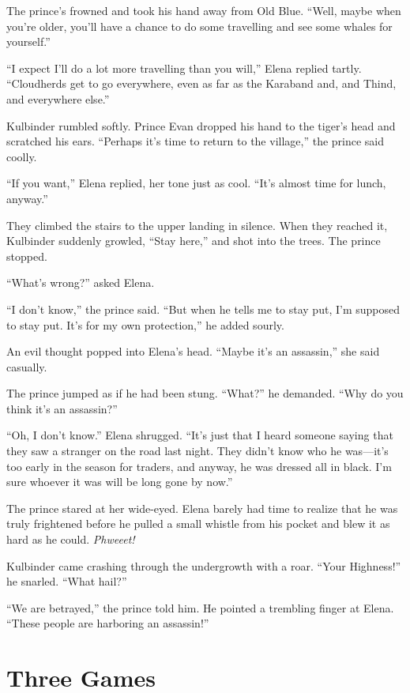 \documentclass[10pt]{book}
\begin{document}
The prince's frowned and took his hand away from Old Blue. ``Well, maybe when you're older, you'll have a chance to do some travelling and see some whales for yourself.''

``I expect I'll do a lot more travelling than you will,'' Elena replied tartly. ``Cloudherds get to go everywhere, even as far as the Karaband and, and Thind, and everywhere else.''

Kulbinder rumbled softly. Prince Evan dropped his hand to the tiger's head and scratched his ears. ``Perhaps it's time to return to the village,'' the prince said coolly.

``If you want,'' Elena replied, her tone just as cool. ``It's almost time for lunch, anyway.''

They climbed the stairs to the upper landing in silence. When they reached it, Kulbinder suddenly growled, ``Stay here,'' and shot into the trees. The prince stopped.

``What's wrong?'' asked Elena.

``I don't know,'' the prince said. ``But when he tells me to stay put, I'm supposed to stay put. It's for my own protection,'' he added sourly.

An evil thought popped into Elena's head. ``Maybe it's an assassin,'' she said casually.

The prince jumped as if he had been stung. ``What?'' he demanded. ``Why do you think it's an assassin?''

``Oh, I don't know.'' Elena shrugged. ``It's just that I heard someone saying that they saw a stranger on the road last night. They didn't know who he was---it's too early in the season for traders, and anyway, he was dressed all in black. I'm sure whoever it was will be long gone by now.''

The prince stared at her wide-eyed. Elena barely had time to realize that he was truly frightened before he pulled a small whistle from his pocket and blew it as hard as he could. \emph{Phweeet!}

Kulbinder came crashing through the undergrowth with a roar. ``Your Highness!'' he snarled. ``What hail?''

``We are betrayed,'' the prince told him. He pointed a trembling finger at Elena. ``These people are harboring an assassin!''

\chapter{Three Games}
\end{document}
